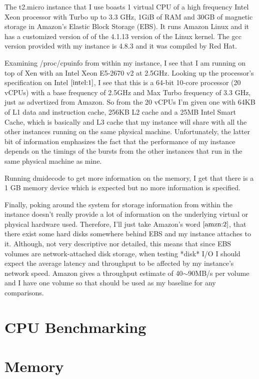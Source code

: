\documentclass[12pt]{article}
\begin{document}
The t2.micro instance that I use boasts 1 virtual
CPU of a high frequency Intel Xeon processor with Turbo up
to 3.3 GHz, 1GiB of RAM and 30GB of magnetic storage in
Amazon's Elastic Block Storage (EBS). It runs Amazon Linux
and it has a customized version of of the 4.1.13 version
of the Linux kernel. The gcc version provided with my instance
is 4.8.3 and it was compiled by Red Hat.

Examining /proc/cpuinfo from within my instance, I see that
I am running on top of Xen with an Intel Xeon E5-2670 v2 at
2.5GHz. Looking up the processor's specification on Intel
$\cite{intel:1}$, I see that this is a 64-bit 10-core processor (20 vCPUs)
with a base frequency of 2.5GHz and Max Turbo frequency
of 3.3 GHz, just as advertized from Amazon. So from the
20 vCPUs I'm given one with 64KB of L1 data and instruction
cache, 256KB L2 cache and a 25MB Intel Smart Cache, which is
basically and L3 cache that my instance will share with
all the other instances running on the same physical
machine. Unfortunately, the latter bit of information
emphasizes the fact that the performance of my instance
depends on the timings of the bursts from the other instances
that run in the same physical machine as mine.

Running dmidecode to get more information on the memory,
I get that there is a 1 GB memory device which is expected
but no more information is specified.

Finally, poking around the system for storage information
from within the instance doesn't really provide a lot of
information on the underlying virtual or physical hardware
used. Therefore, I'll just take Amazon's word $\cite{amzn:2}$, that
there exist some hard disks somewhere behind EBS and my
instance attaches to it. Although, not very descriptive
nor detailed, this means that since EBS volumes are
network-attached disk storage, when testing *disk* I/O
I should expect the average latency and throughput to be
affected by my instance's network speed. Amazon gives a
throughput estimate of 40$\sim$90MB/s per volume and I have
one volume so that should be used as my baseline for
any comparisons.

\section{CPU Benchmarking}

\section{Memory}
\end{document}
